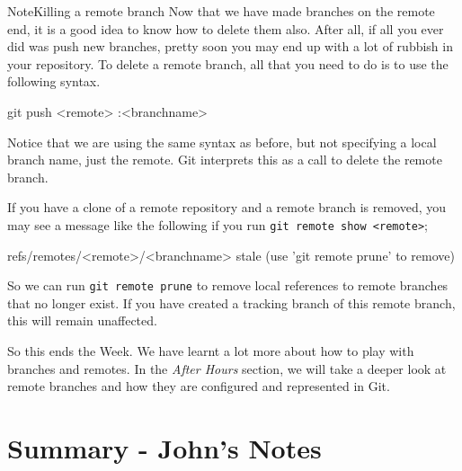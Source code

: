 \begin{callout}{Note}{Killing a remote branch}
Now that we have made branches on the remote end, it is a good idea to know how to delete them also.
After all, if all you ever did was push new branches, pretty soon you may end up with a lot of rubbish in your repository.
To delete a remote branch, all that you need to do is to use the following syntax.

\begin{code}
git push <remote> :<branchname>
\end{code}

Notice that we are using the same syntax as before, but not specifying a local branch name, just the remote.
Git interprets this as a call to delete the remote branch.

If you have a clone of a remote repository and a remote branch is removed, you may see a message like the following if you run \texttt{git remote show <remote>};

\begin{code}
 refs/remotes/<remote>/<branchname> stale (use 'git remote prune' to remove)
\end{code}

So we can run \texttt{git remote prune} to remove local references to remote branches that no longer exist.
If you have created a tracking branch of this remote branch, this will remain unaffected.
\end{callout}

So this ends the Week.
We have learnt a lot more about how to play with branches and remotes.
In the \emph{After Hours} section, we will take a deeper look at remote branches and how they are configured and represented in Git.

\clearpage
\section{Summary - John's Notes}
